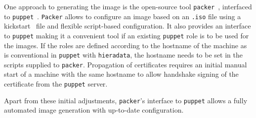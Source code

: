 
One approach to generating the image is the open-source tool
\texttt{packer}~\cite{packer}, interfaced to \texttt{puppet}~\cite{puppet}.
\texttt{Packer} allows to configure an image based on an \texttt{.iso} file using a kickstart~\cite{kickstart} file and flexible script-based configuration. 
It also provides an interface to \texttt{puppet} making it a convenient tool if an existing \texttt{puppet} role is to be used for the images. If the roles are defined according to the hostname of the machine as is conventional in \texttt{puppet} with \texttt{hieradata}, the hostname needs to be set in the scripts supplied to \texttt{packer}. Propagation of certificates requires an initial manual start of a machine with the same hostname to allow handshake signing of the certificate from the \texttt{puppet} server.

Apart from these initial adjustments, \texttt{packer}'s interface to \texttt{puppet} allows a fully automated image generation with up-to-date configuration.
